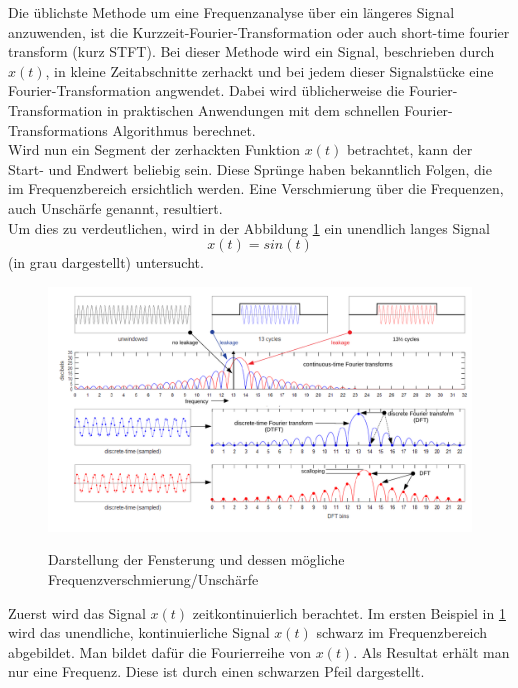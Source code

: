 
Die üblichste Methode um eine Frequenzanalyse über ein längeres Signal anzuwenden, ist die  Kurzzeit-Fourier-Transformation oder auch short-time fourier transform (kurz STFT). Bei dieser Methode wird ein Signal, beschrieben durch $x(t)$, in kleine Zeitabschnitte zerhackt und bei jedem dieser Signalstücke eine Fourier-Transformation angwendet. Dabei wird üblicherweise die Fourier-Transformation in praktischen Anwendungen mit dem schnellen Fourier-Transformations Algorithmus berechnet.\\

Wird nun ein Segment der zerhackten Funktion $x(t)$ betrachtet, kann der Start- und Endwert beliebig sein. Diese Sprünge haben bekanntlich Folgen, die im Frequenzbereich ersichtlich werden. Eine Verschmierung über die Frequenzen, auch Unschärfe genannt, resultiert. \\

Um dies zu verdeutlichen, wird in der Abbildung \ref{fig:Spectral} ein unendlich langes Signal 
\[x(t)=sin(t)\]
(in grau dargestellt) untersucht. \\

\begin{figure}[!ht]
	\centering
	\includegraphics[scale=0.8]{papers/autotune/sections/fft/images/windows/Spectral.pdf}
	\caption{Darstellung der Fensterung und dessen mögliche Frequenzverschmierung/Unschärfe}\cite{wikipedia:Window}
	\label{fig:Spectral}
\end{figure}%

Zuerst wird das Signal $x(t)$ zeitkontinuierlich berachtet. Im ersten Beispiel in \ref{fig:Spectral} wird das unendliche, kontinuierliche Signal $x(t)$ schwarz im Frequenzbereich abgebildet. Man bildet dafür die Fourierreihe von $x(t)$. Als Resultat erhält man nur eine Frequenz. Diese ist durch einen schwarzen Pfeil dargestellt.\\

